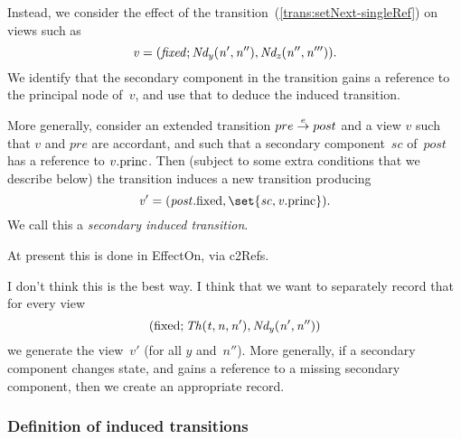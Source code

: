 Instead, we consider the effect of the 
transition~(\ref{trans:setNext-singleRef}) on views such as
\[\mit
v = (fixed; Nd_y(n', n''), Nd_z(n'', n''')).
\]
We identify that the secondary component in the  transition gains a
reference to the principal node of~$v$, and use that to deduce the induced
transition. 

More generally, consider an extended transition $pre \trans{e} post$ and a
view $v$ such that $v$ and $pre$ are accordant, and such that a secondary
component~$sc$ of~$post$ has a reference to $v.\princ$.  Then (subject to some
extra conditions that we describe below) the transition induces a new
transition producing
\[\mit
v' = (post.\fixed, \set{sc, v.\princ}).
\]
We call this a \emph{secondary induced transition}. 

\begin{impNote}
At present this is done in EffectOn, via c2Refs. 
\end{impNote}

\begin{improve}
I don't think this is the
best way.  I think that we want to separately record that for every view
\[\mit 
(\fixed; Th(t, n, n'), Nd_y(n', n''))
\]
we generate the view~$v'$ (for all $y$ and~$n''$).  More generally, if a
secondary component changes state, and gains a reference to a missing
secondary component, then we create an appropriate record.
\end{improve}



\subsubsection{Definition of induced transitions}

